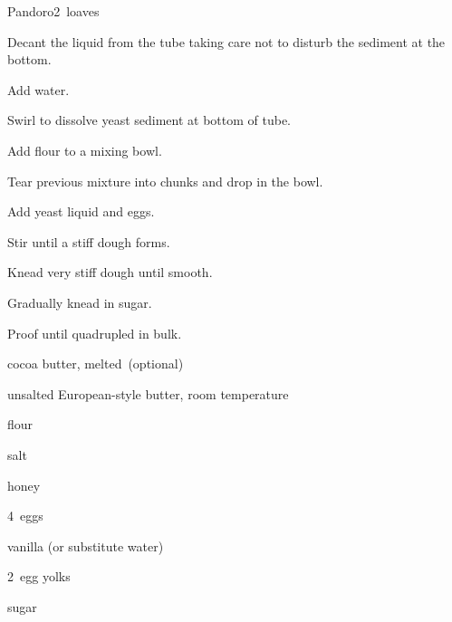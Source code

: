 \begin{recipe}{Pandoro}{}{2~loaves}
\begin{directions}
\item Decant the liquid from the tube taking care not to disturb the sediment at the bottom.
\item Add water.
\item Swirl to dissolve yeast sediment at bottom of tube.
\item Add flour to a mixing bowl.
\item Tear previous mixture into chunks and drop in the bowl.
\item Add yeast liquid and eggs.
\item Stir until a stiff dough forms.
\item Knead very stiff dough until smooth.
\item Gradually knead in sugar.
\item Proof until quadrupled in bulk.
\end{directions}

\begin{ingredients}
\item {} cocoa butter, melted~(optional)
\item {} unsalted European-style butter, room temperature
\item {} flour
\item {} salt
\item {} honey
\item 4~eggs
\item {} vanilla (or substitute water)
\item 2~egg yolks
\item {} sugar
\end{ingredients}


\end{recipe}
